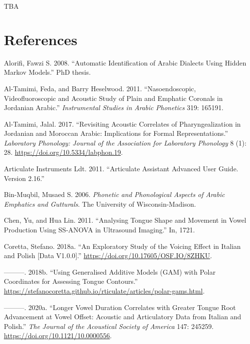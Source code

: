 \documentclass[
]{interact}
\newlength{\cslhangindent}
\newenvironment{CSLReferences}[2] %
 {\begin{list}{}{%
  \setlength{\itemindent}{0pt}
  \setlength{\leftmargin}{0pt}
  \setlength{\parsep}{0pt}
  \ifodd #1
   \setlength{\leftmargin}{\cslhangindent}
   \setlength{\itemindent}{-1\cslhangindent}
  \fi
  \setlength{\itemsep}{#2\baselineskip}}}
 {\end{list}}
\begin{document}
TBA

\section{References}\label{references}

\label{refs}
\begin{CSLReferences}{1}{0}
Alorifi, Fawzi S. 2008. {``Automatic Identification of Arabic Dialects
Using Hidden Markov Models.''} PhD thesis.

Al-Tamimi, Feda, and Barry Heselwood. 2011. {``Nasoendoscopic,
Videofluoroscopic and Acoustic Study of Plain and Emphatic Coronals in
Jordanian Arabic.''} \emph{Instrumental Studies in Arabic Phonetics}
319: 165191.

Al-Tamimi, Jalal. 2017. {``Revisiting Acoustic Correlates of
Pharyngealization in Jordanian and Moroccan Arabic: Implications for
Formal Representations.''} \emph{Laboratory Phonology: Journal of the
Association for Laboratory Phonology} 8 (1): 28.
\url{https://doi.org/10.5334/labphon.19}.

Articulate Instruments Ldt. 2011. {``Articulate Assistant Advanced User
Guide. {Version} 2.16.''}

Bin-Muqbil, Musaed S. 2006. \emph{Phonetic and Phonological Aspects of
Arabic Emphatics and Gutturals}. The University of Wisconsin-Madison.

Chen, Yu, and Hua Lin. 2011. {``Analysing Tongue Shape and Movement in
Vowel Production Using SS-ANOVA in Ultrasound Imaging.''} In, 1721.

Coretta, Stefano. 2018a. {``An Exploratory Study of the Voicing Effect
in Italian and Polish {[}Data V1.0.0{]}.''}
\url{https://doi.org/10.17605/OSF.IO/8ZHKU}.

---------. 2018b. {``Using Generalised Additive Models (GAM) with Polar
Coordinates for Assessing Tongue Contours.''}
\url{https://stefanocoretta.github.io/rticulate/articles/polar-gams.html}.

---------. 2020a. {``Longer Vowel Duration Correlates with Greater
Tongue Root Advancement at Vowel Offset: Acoustic and Articulatory Data
from Italian and Polish.''} \emph{The Journal of the Acoustical Society
of America} 147: 245259. \url{https://doi.org/10.1121/10.0000556}.


\end{CSLReferences}
\end{document}
